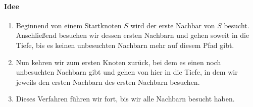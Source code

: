 \documentclass[11pt,a4paper]{scrartcl}
\begin{document}
\paragraph{Idee}
\begin{enumerate}
\item Beginnend von einem Startknoten $S$ wird der erste Nachbar von $S$ besucht. Anschließend besuchen wir dessen ersten Nachbarn und gehen soweit in die Tiefe, bis es keinen unbesuchten Nachbarn mehr auf diesem Pfad gibt.
\item Nun kehren wir zum ersten Knoten zurück, bei dem es einen noch unbesuchten Nachbarn gibt und gehen von hier in die Tiefe, in dem wir jeweils den ersten Nachbarn des ersten Nachbarn besuchen.
\item Dieses Verfahren führen wir fort, bis wir alle Nachbarn besucht haben.
\end{enumerate}
\end{document}
